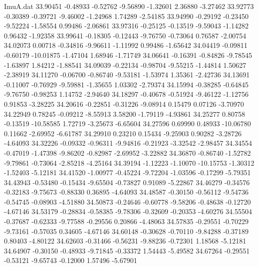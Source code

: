 \begin{filecontents}{ImuA.dat}
  33.90451   -0.48933   -0.52762   -9.56890   -1.32601    2.36880   -3.27462
  33.92773   -0.30389   -0.39721   -9.46002   -1.24968    1.74289   -2.54185
  33.94990   -0.29192   -0.23450   -9.52224   -1.58554    0.99486   -2.06861
  33.97316   -0.25125   -0.13519   -9.59043   -1.14282    0.96432   -1.92358
  33.99641   -0.18305   -0.12443   -9.76750   -0.73064    0.76587   -2.00754
  34.02073    0.00718   -0.34816   -9.96611   -1.11992    0.99486   -1.65642
  34.04419   -0.09811   -0.60179  -10.01875   -1.47104    1.68946   -1.71749
  34.06641   -0.16391   -0.84826   -9.78545   -1.63897    1.84212   -1.88541
  34.09039   -0.22134   -0.98704   -9.55215   -1.44814    1.50627   -2.38919
  34.11270   -0.06700   -0.86740   -9.53181   -1.53974    1.35361   -2.42736
  34.13691   -0.11007   -0.76929   -9.59881   -1.35655    1.03302   -2.79374
  34.15994   -0.38285   -0.64845   -9.76750   -0.98253    1.14752   -2.94640
  34.18297   -0.40678   -0.51924   -9.46122   -1.12756    0.91853   -3.28225
  34.20616   -0.22851   -0.31226   -9.08914    0.15479    0.07126   -3.70970
  34.22949    0.78245   -0.09212   -8.55913    3.58200   -1.79119   -4.93861
  34.25277    0.80758   -0.13519  -10.58585    1.72719   -3.25673   -6.65604
  34.27596    0.69990    0.48933  -10.06780    0.11662   -2.69952   -6.61787
  34.29910    0.23210    0.15434   -9.25903    0.90282   -3.28726   -4.64093
  34.32226   -0.09332   -0.96311   -9.94816   -0.21923   -3.32542   -2.98457
  34.34554   -0.47019   -1.47398   -9.86202   -0.82987   -2.69952   -3.22882
  34.36870   -0.86740   -1.52782   -9.79861   -0.73064   -2.85218   -4.25164
  34.39194   -1.12223   -1.10070  -10.15753   -1.30312   -1.52403   -5.12181
  34.41520   -1.00977   -0.45224   -9.72204   -1.03596   -0.17299   -5.79351
  34.43943   -0.53480   -0.15434   -9.65504   -0.73827    0.91089   -5.22867
  34.46279   -0.34576   -0.32183   -9.75673   -0.88330    0.36895   -4.64093
  34.48587   -0.30150   -0.56112   -9.54736   -0.54745   -0.08903   -4.51880
  34.50873   -0.24646   -0.60778   -9.58206   -0.48638   -0.12720   -4.67146
  34.53179   -0.28834   -0.58385   -9.78306   -0.32609   -0.20353   -4.60276
  34.55504   -0.37687   -0.62333   -9.77588   -0.29556    0.20866   -4.48063
  34.57835   -0.29551   -0.70229   -9.73161   -0.57035    0.34605   -4.67146
  34.60148   -0.30628   -0.70110   -9.84288   -0.37189    0.80403   -4.80122
  34.62603   -0.31466   -0.56231   -9.88236   -0.72301    1.18568   -5.12181
  34.64907   -0.30150   -0.48933   -9.71845   -0.33372    1.54443   -5.49582
  34.67264   -0.29551   -0.53121   -9.65743   -0.12000    1.57496   -5.67901

\end{filecontents}
